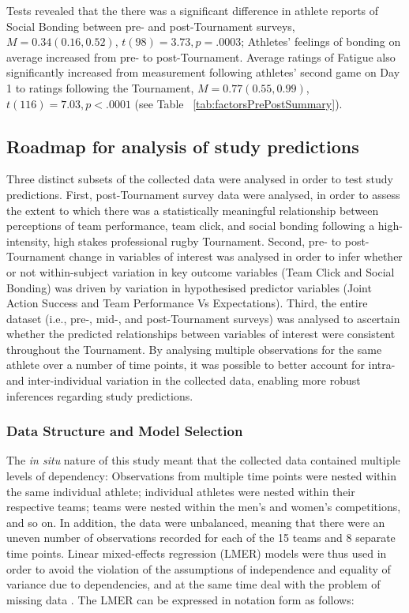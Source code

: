  Tests revealed that the there was a significant difference in athlete reports of Social Bonding between pre- and post-Tournament surveys, $M = 0.34 (0.16, 0.52)$, $t(98)= 3.73, p = .0003$; Athletes' feelings of bonding on average increased from pre- to post-Tournament.  Average ratings of Fatigue also significantly increased from measurement following athletes' second game on Day 1 to ratings following the Tournament, $M =  0.77 (0.55, 0.99)$, $t(116)= 7.03, p < .0001$ (see Table ~\ref{tab:factorsPrePostSummary}).

 \begin{landscape}
 
  \end{landscape}
 \restoregeometry



\subsection{Roadmap for analysis of study predictions}
Three distinct subsets of the collected data were analysed in order to test study predictions. First, post-Tournament survey data were analysed, in order to assess the extent to which there was a statistically meaningful relationship between perceptions of team performance, team click, and social bonding following a high-intensity, high stakes professional rugby Tournament.  Second, pre- to post-Tournament change in variables of interest was analysed in order to infer whether or not within-subject variation in key outcome variables (Team Click and Social Bonding) was driven by variation in hypothesised predictor variables (Joint Action Success and Team Performance Vs Expectations). Third, the entire dataset (i.e., pre-, mid-, and post-Tournament surveys) was analysed to ascertain whether the predicted relationships between variables of interest were consistent throughout the Tournament.  By analysing multiple observations for the same athlete over a number of time points, it was possible to better account for intra- and inter-individual variation in the collected data, enabling more robust inferences regarding study predictions.

\subsubsection{Data Structure and Model Selection}
The \textit{in situ} nature of this study meant that the collected data contained multiple levels of dependency: Observations from multiple time points were nested within the same individual athlete; individual athletes were nested within their respective teams; teams were nested within the men’s and women’s competitions, and so on.  In addition, the data were unbalanced, meaning that there were an uneven number of observations recorded for each of the 15 teams and 8 separate time points. Linear mixed-effects regression (LMER) models were thus used in order to avoid the violation of the assumptions of independence and equality of variance due to dependencies, and at the same time deal with the problem of missing data \citep{Quene2004,Field2012}.  The LMER can be expressed in notation form as follows:


